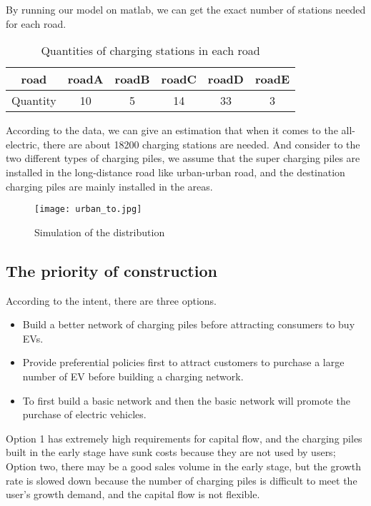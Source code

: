 \documentclass[12pt]{article}  %
\begin{document}
By running our model on matlab, we can get the exact number of stations needed for each road. 
\begin{table}[H]
	\caption{Quantities of charging stations in each road}
	\begin{center}
		\begin{tabular}{cccccc}
			\toprule
			road & roadA & roadB & roadC & roadD & roadE\\
			\midrule
			Quantity & 10 & 5 & 14 & 33 & 3\\
			\bottomrule
		\end{tabular}\label{tb:4}
	\end{center}
\end{table}

According to the data, we can give an estimation that when it comes to the all-electric, there are about 18200 charging stations are needed. And consider to the two different types of charging piles, we assume that the super charging piles are installed in the long-distance road like urban-urban road, and the destination charging piles are mainly installed in the areas.
\begin{figure}[H]
	\centering
	\texttt{[image: urban\_to.jpg]}
	\caption{Simulation of the distribution}\label{fig:10}
\end{figure}
\subsection{The priority of construction}

According to the intent, there are three options.
\begin{itemize}
\item Build a better network of charging piles before attracting consumers to buy EVs.
\item Provide preferential policies first to attract customers to purchase a large number of EV before building a charging network.
\item To first build a basic network and then the basic network will promote the purchase of electric vehicles.
\end{itemize}

Option 1 has extremely high requirements for capital flow, and the charging piles built in the early stage have sunk costs because they are not used by users;
Option two, there may be a good sales volume in the early stage, but the growth rate is slowed down because the number of charging piles is difficult to meet the user's growth demand, and the capital flow is not flexible.
\end{document}
